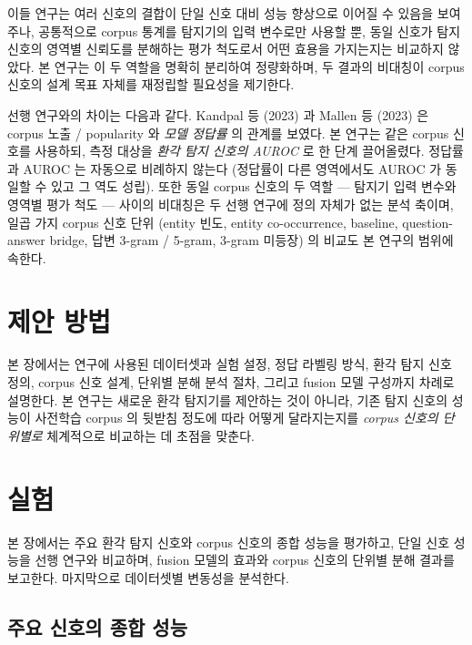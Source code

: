 \documentclass[oneside,ko,under]{snuthesis}
\begin{document}
이들 연구는 여러 신호의 결합이 단일 신호 대비 성능 향상으로 이어질 수 있음을 보여주나, 공통적으로 corpus 통계를 탐지기의 입력 변수로만 사용할 뿐, 동일 신호가 탐지 신호의 영역별 신뢰도를 분해하는 평가 척도로서 어떤 효용을 가지는지는 비교하지 않았다. 본 연구는 이 두 역할을 명확히 분리하여 정량화하며, 두 결과의 비대칭이 corpus 신호의 설계 목표 자체를 재정립할 필요성을 제기한다.

선행 연구와의 차이는 다음과 같다. Kandpal 등 (2023)\cite{kandpal2023longtail} 과 Mallen 등 (2023)\cite{mallen2023whennot} 은 corpus 노출 / popularity 와 \emph{모델 정답률} 의 관계를 보였다. 본 연구는 같은 corpus 신호를 사용하되, 측정 대상을 \emph{환각 탐지 신호의 AUROC} 로 한 단계 끌어올렸다. 정답률과 AUROC 는 자동으로 비례하지 않는다 (정답률이 다른 영역에서도 AUROC 가 동일할 수 있고 그 역도 성립). 또한 동일 corpus 신호의 두 역할 — 탐지기 입력 변수와 영역별 평가 척도 — 사이의 비대칭은 두 선행 연구에 정의 자체가 없는 분석 축이며, 일곱 가지 corpus 신호 단위 (entity 빈도, entity co-occurrence, baseline, question-answer bridge, 답변 3-gram / 5-gram, 3-gram 미등장) 의 비교도 본 연구의 범위에 속한다.


\chapter{제안 방법}{\label{ch:method}}

본 장에서는 연구에 사용된 데이터셋과 실험 설정, 정답 라벨링 방식, 환각 탐지 신호 정의, corpus 신호 설계, 단위별 분해 분석 절차, 그리고 fusion 모델 구성까지 차례로 설명한다. 본 연구는 새로운 환각 탐지기를 제안하는 것이 아니라, 기존 탐지 신호의 성능이 사전학습 corpus 의 뒷받침 정도에 따라 어떻게 달라지는지를 \emph{corpus 신호의 단위별로} 체계적으로 비교하는 데 초점을 맞춘다.




\chapter{실험}{\label{ch:experiment}}

본 장에서는 주요 환각 탐지 신호와 corpus 신호의 종합 성능을 평가하고, 단일 신호 성능을 선행 연구와 비교하며, fusion 모델의 효과와 corpus 신호의 단위별 분해 결과를 보고한다. 마지막으로 데이터셋별 변동성을 분석한다.

\section{주요 신호의 종합 성능}
\end{document}
